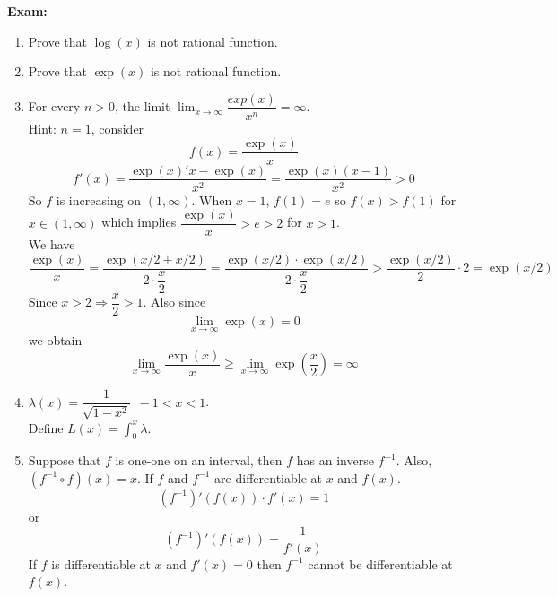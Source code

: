 \documentclass[10pt,letterpaper]{article}
\begin{document}
	\textbf{Exam: } 
\begin{enumerate}[(1)]
	\item Prove that $\log(x)$ is not rational function.
	\item Prove that $\exp(x)$ is not rational function.
	\item For every $n > 0$, the limit $\displaystyle\lim_{x\to \infty} \dfrac{exp(x)}{x^n} = \infty$. \\
	Hint: $n = 1$, consider
	$$f(x) = \dfrac{\exp(x)}{x}$$
	$$f'(x) = \dfrac{\exp(x)'x - \exp(x)}{x^2}
	= \dfrac{\exp(x)(x - 1)}{x^2} > 0$$
	So $f$ is increasing on $(1, \infty)$. When $x = 1$, $f(1) = e$ so $f(x) > f(1)$ for
	$x \in (1, \infty)$ which implies $\dfrac{\exp(x)}{x} > e > 2$ for $x > 1$. \\
	We have
	$$\dfrac{\exp(x)}{x} = \dfrac{\exp(x/2 + x/2)}{2 \cdot \dfrac{x}{2}}
	= \dfrac{\exp(x/2) \cdot \exp(x/2)}{2 \cdot \dfrac{x}{2}} > \dfrac{\exp(x/2)}{2} \cdot 2 = \exp(x/2)$$
	Since $x > 2 \Rightarrow \dfrac{x}{2} > 1$. Also since 
	$$\displaystyle\lim_{x\to \infty} \exp(x) = 0$$
	we obtain
	$$\displaystyle\lim_{x\to \infty} \dfrac{\exp(x)}{x} \geq 
	\displaystyle\lim_{x\to \infty} \exp(\dfrac{x}{2}) = \infty$$
	
	\item $\lambda(x) = \dfrac{1}{\sqrt{1 - x^2}} \,\,\, -1 < x < 1$. \\
	Define $L(x) = \displaystyle\int_{0}^{x} \lambda$.
	
	\item Suppose that $f$ is one-one on an interval, then $f$ has an inverse $f^{-1}$.
	Also, $(f^{-1} \circ f)(x) = x$. If $f$ and $f^{-1}$ are differentiable at $x$ and $f(x)$.
	$$(f^{-1})'(f(x)) \cdot f'(x) = 1$$
	or $$(f^{-1})'(f(x)) = \dfrac{1}{f'(x)}$$
	If $f$ is differentiable at $x$ and $f'(x) = 0$ then $f^{-1}$ cannot be differentiable at $f(x)$. \\
	

\end{enumerate}
\end{document}
